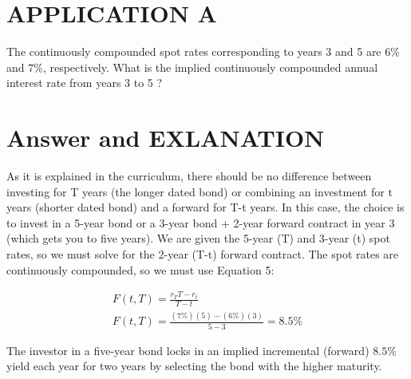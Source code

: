 \documentclass[11pt]{article}
\begin{document}
\section*{APPLICATION A}
The continuously compounded spot rates corresponding to years 3 and 5 are $6 \%$ and $7 \%$, respectively. What is the implied continuously compounded annual interest rate from years 3 to 5 ?

\section*{Answer and EXLANATION}
As it is explained in the curriculum, there should be no difference between investing for T years (the longer dated bond) or combining an investment for t years (shorter dated bond) and a forward for T-t years. In this case, the choice is to invest in a 5-year bond or a 3-year bond + 2-year forward contract in year 3 (which gets you to five years). We are given the 5-year (T) and 3-year (t) spot rates, so we must solve for the 2-year (T-t) forward contract. The spot rates are continuously compounded, so we must use Equation 5:

$$
\begin{gathered}
F(t, T)=\frac{r_{T} T-r_{t}}{T-t} \\
F(t, T)=\frac{(7 \%)(5)-(6 \%)(3)}{5-3}=8.5 \%
\end{gathered}
$$

The investor in a five-year bond locks in an implied incremental (forward) $8.5 \%$ yield each year for two years by selecting the bond with the higher maturity.
\end{document}
